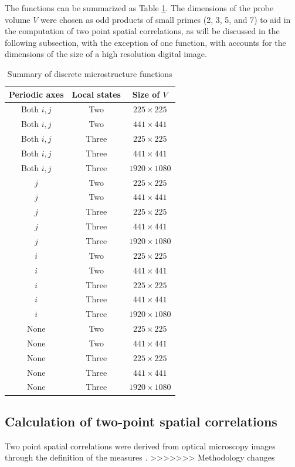 The functions can be summarized as Table \ref{tab:fxns}.
The dimensions of the probe volume $V$ were chosen as odd products of small primes (2, 3, 5, and 7) to aid in the computation of two point spatial correlations, as will be discussed in the following subsection, with the exception of one function, with accounts for the dimensions of the size of a high resolution digital image.

\begin{table}
  \caption{Summary of discrete microstructure functions}
  \centering
  \begin{tabular}{c c c}
    \hline\hline
    Periodic axes & Local states & Size of $V$ \\
    \hline
    Both $i, j$ & Two & $225 \times 225$ \\
    Both $i, j$ & Two & $441 \times 441$ \\
    Both $i, j$ & Three & $225 \times 225$ \\
    Both $i, j$ & Three & $441 \times 441$ \\
    Both $i, j$ & Three & $1920 \times 1080$ \\
    \hline
    $j$ & Two & $225 \times 225$ \\
    $j$ & Two & $441 \times 441$ \\
    $j$ & Three & $225 \times 225$ \\
    $j$ & Three & $441 \times 441$ \\
    $j$ & Three & $1920 \times 1080$ \\
    \hline
    $i$ & Two & $225 \times 225$ \\
    $i$ & Two & $441 \times 441$ \\
    $i$ & Three & $225 \times 225$ \\
    $i$ & Three & $441 \times 441$ \\
    $i$ & Three & $1920 \times 1080$ \\
    \hline
    None & Two & $225 \times 225$ \\
    None & Two & $441 \times 441$ \\
    None & Three & $225 \times 225$ \\
    None & Three & $441 \times 441$ \\
    None & Three & $1920 \times 1080$ \\[1ex]
  \end{tabular}
  \label{tab:fxns}
\end{table}

\subsection{Calculation of two-point spatial correlations}
Two point spatial correlations were derived from optical microscopy images through the definition of the measures \cite{gupta15}.
>>>>>>> Methodology changes

